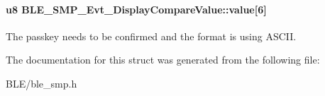 \paragraph[{\texorpdfstring{value}{value}}]{\setlength{\rightskip}{0pt plus 5cm}u8 B\+L\+E\+\_\+\+S\+M\+P\+\_\+\+Evt\+\_\+\+Display\+Compare\+Value\+::value\mbox{[}6\mbox{]}}\hypertarget{struct_b_l_e___s_m_p___evt___display_compare_value_a89bfdab60435d17a48af90596c11d030}{}\label{struct_b_l_e___s_m_p___evt___display_compare_value_a89bfdab60435d17a48af90596c11d030}
The passkey needs to be confirmed and the format is using A\+S\+C\+II. 

The documentation for this struct was generated from the following file\+:\begin{DoxyCompactItemize}
\item 
B\+L\+E/ble\+\_\+smp.\+h\end{DoxyCompactItemize}
